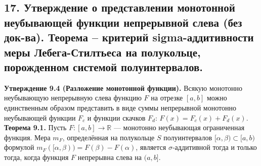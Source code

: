 \documentclass[12pt]{article}
\begin{document}
\subsection*{17. Утверждение о представлении монотонной неубывающей функции непрерывной
слева (без док-ва). Теорема – критерий sigma-аддитивности меры Лебега-Стилтьеса на
полукольце, порожденном системой полуинтервалов.}
\textbf{Утверждение 9.4 (Разложение монотонной функции).} Всякую монотонно неубывающую непрерывную слева функцию $F$ на отрезке $[a,b]$ можно единственным образом представить в виде суммы непрерывной монотонно неубывающей функции $F_c$ и функции скачков $F_d$: $F(x)=F_c(x)+F_d(x)$. \\\textbf{Теорема 9.1.} Пусть $F:[a,b]\to\mathbb{R}$ — монотонно неубывающая ограниченная функция. Мера $m_F$, определённая на полукольце $S$ полуинтервалов $[\alpha,\beta)\subset[a,b)$ формулой $m_F([\alpha,\beta))=F(\beta)-F(\alpha)$, является $\sigma$-аддитивной тогда и только тогда, когда функция $F$ непрерывна слева на $(a,b]$.
\end{document}
